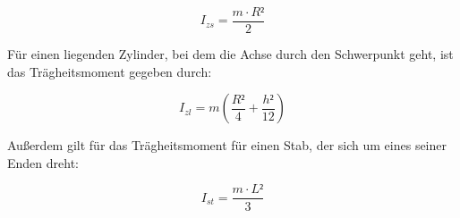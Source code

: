 \begin{equation}
I_{zs}=\frac{m\cdot R²}{2}
\end{equation}

Für einen liegenden Zylinder, bei dem die Achse durch den Schwerpunkt geht,
ist das Trägheitsmoment gegeben durch: 

\begin{equation}
I_{zl} = m\left(\frac{R²}{4}+\frac{h²}{12}\right)
\end{equation}

Außerdem gilt für das Trägheitsmoment für einen Stab, der sich um 
eines seiner Enden dreht: 

\begin{equation}
I_{st}=\frac{m\cdot L²}{3}
\end{equation}

